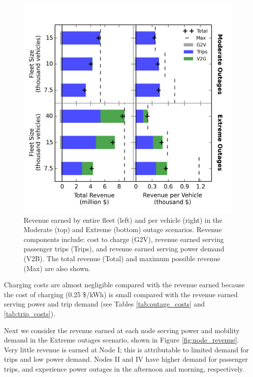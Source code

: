 \documentclass[journal]{IEEEtran}
\begin{document}
\begin{figure}[!htbp]
  \includegraphics[width=\linewidth]{plots/full_revenue_barchart.png}
  \caption{Revenue earned by entire fleet (left) and per vehicle (right) in the Moderate (top) and Extreme (bottom) outage scenarios. Revenue components include: cost to charge (G2V), revenue earned serving passenger trips (Trips), and revenue earned serving power demand (V2B). The total revenue (Total) and maximum possible revenue (Max) are also shown.}
  \label{fig:revenue_bar}
\end{figure}

Charging costs are almost negligible compared with the revenue earned because the cost of charging (0.25 \$/kWh) is small compared with the revenue earned serving power and trip demand (see Tables \ref{tab:outage_costs} and \ref{tab:trip_costs}).

Next we consider the revenue earned at each node serving power and mobility demand in the Extreme outages scenario, shown in Figure \ref{fig:node_revenue}. Very little revenue is earned at Node I; this is attributable to limited demand for trips and low power demand. Nodes II and IV have higher demand for passenger trips, and experience power outages in the afternoon and morning, respectively.
\end{document}
